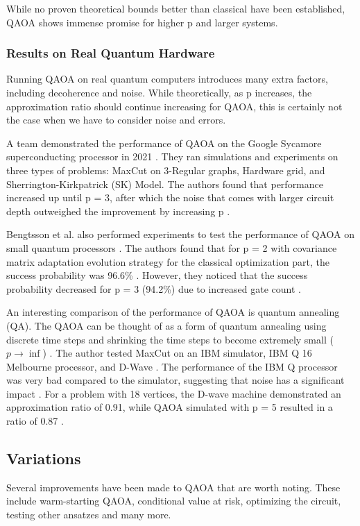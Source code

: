 While no proven theoretical bounds better than classical have been established, QAOA shows immense promise for higher p and larger systems.

\subsubsection{Results on Real Quantum Hardware}
Running QAOA on real quantum computers introduces many extra factors, including decoherence and noise. While theoretically, as p increases, the approximation ratio should continue increasing for QAOA, this is certainly not the case when we have to consider noise and errors.

A team demonstrated the performance of QAOA on the Google Sycamore superconducting processor in 2021 \cite{27harrigan2020nonplanargraphs}. They ran simulations and experiments on three types of problems: MaxCut on 3-Regular graphs, Hardware grid, and Sherrington-Kirkpatrick (SK) Model. The authors found that performance increased up until p = 3, after which the noise that comes with larger circuit depth outweighed the improvement by increasing p \cite{27harrigan2020nonplanargraphs}.

Bengtsson et al. also performed experiments to test the performance of QAOA on small quantum processors \cite{28bengtsoon2019improved}. The authors found that for p = 2 with covariance matrix adaptation evolution strategy for the classical optimization part, the success probability was 96.6\% \cite{28bengtsoon2019improved}. However, they noticed that the success probability decreased for p = 3 (94.2\%) due to increased gate count \cite{28bengtsoon2019improved}.

An interesting comparison of the performance of QAOA is quantum annealing (QA). The QAOA can be thought of as a form of quantum annealing using discrete time steps and shrinking the time steps to become extremely small ($p \rightarrow \inf$) \cite{25Willsch_2020}. The author tested MaxCut on an IBM simulator, IBM Q 16 Melbourne processor, and D-Wave \cite{25Willsch_2020}. The performance of the IBM Q processor was very bad compared to the simulator, suggesting that noise has a significant impact \cite{25Willsch_2020}. For a problem with 18 vertices, the D-wave machine demonstrated an approximation ratio of 0.91, while QAOA simulated with p = 5 resulted in a ratio of 0.87 \cite{25Willsch_2020}.

\subsection{Variations}
Several improvements have been made to QAOA that are worth noting. These include warm-starting QAOA, conditional value at risk, optimizing the circuit, testing other ansatzes and many more.

